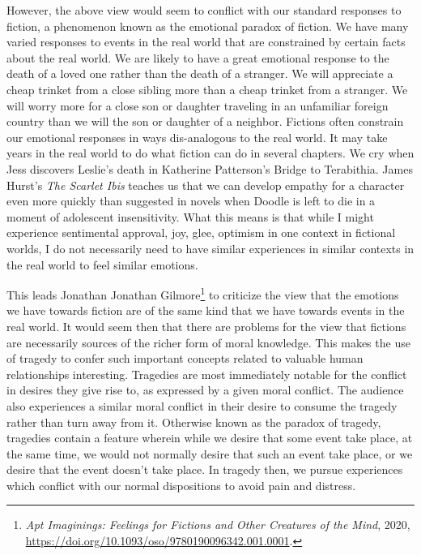 \documentclass[
  12pt,
]{book}
\theoremstyle{definition}
\theoremstyle{definition}
\theoremstyle{definition}
\theoremstyle{definition}
\theoremstyle{remark}
\begin{document}
However, the above view would seem to conflict with our standard responses to fiction, a phenomenon known as the emotional paradox of fiction. We have many varied responses to events in the real world that are constrained by certain facts about the real world. We are likely to have a great emotional response to the death of a loved one rather than the death of a stranger. We will appreciate a cheap trinket from a close sibling more than a cheap trinket from a stranger. We will worry more for a close son or daughter traveling in an unfamiliar foreign country than we will the son or daughter of a neighbor. Fictions often constrain our emotional responses in ways dis-analogous to the real world. It may take years in the real world to do what fiction can do in several chapters. We cry when Jess discovers Leslie's death in Katherine Patterson's Bridge to Terabithia. James Hurst's \emph{The Scarlet Ibis} teaches us that we can develop empathy for a character even more quickly than suggested in novels when Doodle is left to die in a moment of adolescent insensitivity. What this means is that while I might experience sentimental approval, joy, glee, optimism in one context in fictional worlds, I do not necessarily need to have similar experiences in similar contexts in the real world to feel similar emotions.

This leads Jonathan Jonathan Gilmore\footnote{\emph{Apt {Imaginings}: {Feelings} for {Fictions} and {Other Creatures} of the {Mind}}, 2020, \url{https://doi.org/10.1093/oso/9780190096342.001.0001}.} to criticize the view that the emotions we have towards fiction are of the same kind that we have towards events in the real world. It would seem then that there are problems for the view that fictions are necessarily sources of the richer form of moral knowledge. This makes the use of tragedy to confer such important concepts related to valuable human relationships interesting. Tragedies are most immediately notable for the conflict in desires they give rise to, as expressed by a given moral conflict. The audience also experiences a similar moral conflict in their desire to consume the tragedy rather than turn away from it. Otherwise known as the paradox of tragedy, tragedies contain a feature wherein while we desire that some event take place, at the same time, we would not normally desire that such an event take place, or we desire that the event doesn't take place. In tragedy then, we pursue experiences which conflict with our normal dispositions to avoid pain and distress.
\end{document}
